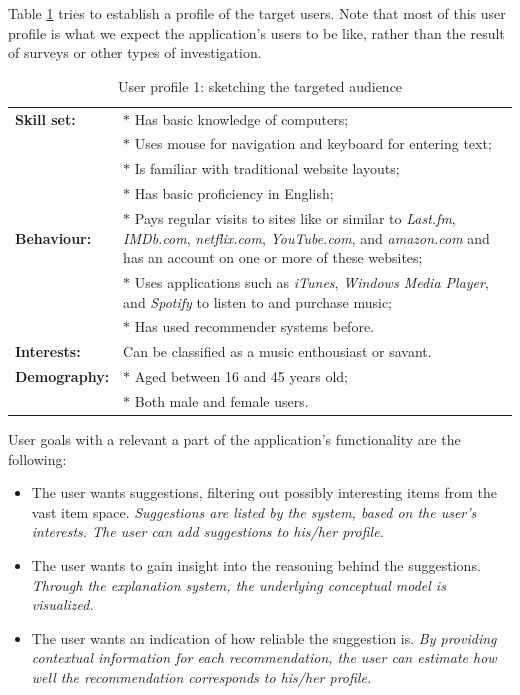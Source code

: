 Table \ref{tab:user_profile1} tries to establish a profile of the target users. Note that most of this user profile is what we expect the application's users to be like, rather than the result of surveys or other types of investigation.

\begin{table}[h]
\caption{User profile 1: sketching the targeted audience}
\begin{center}
	\begin{tabular}{ l p{300px} } %
		\hline
		\textbf{Skill set:}		& $*$ Has basic knowledge of computers; \\
													& $*$ Uses mouse for navigation and keyboard for entering text;	\\
													& $*$ Is familiar with traditional website layouts;	\\
													& $*$ Has basic proficiency in English;	\\
		
		\textbf{Behaviour:}		& $*$ Pays regular visits to sites like or similar to \emph{Last.fm}, \emph{IMDb.com}, \emph{netflix.com}, \emph{YouTube.com}, and \emph{amazon.com} and has an account on one or more of these websites; \\
													& $*$ Uses applications such as \emph{iTunes}, \emph{Windows Media Player}, and \emph{Spotify} to listen to and purchase music; \\
													& $*$ Has used recommender systems before. \\
		
		\textbf{Interests:}		& Can be classified as a music enthousiast or savant. \\
		\textbf{Demography:}	& $*$ Aged between 16 and 45 years old;	\\
													& $*$ Both male and female users.	\\
		
		\hline
	\end{tabular}
\end{center}
\label{tab:user_profile1}
\end{table}


User goals with a relevant a part of the application's functionality are the following:

\begin{itemize}
	\item The user wants suggestions, filtering out possibly interesting items from the vast item space. \textit{Suggestions are listed by the system, based on the user's interests. The user can add suggestions to his/her profile.}
	\item The user wants to gain insight into the reasoning behind the suggestions. \textit{Through the explanation system, the underlying conceptual model is visualized.}
	\item The user wants an indication of how reliable the suggestion is. \textit{By providing contextual information for each recommendation, the user can estimate how well the recommendation corresponds to his/her profile.}
\end{itemize}



